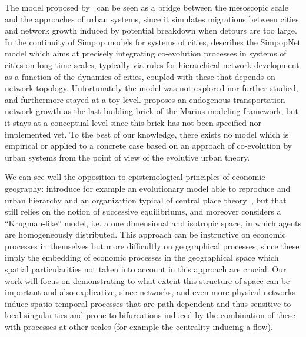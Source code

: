 
The model proposed by~\cite{blumenfeld2010network} can be seen as a bridge between the mesoscopic scale and the approaches of urban systems, since it simulates migrations between cities and network growth induced by potential breakdown when detours are too large. In the continuity of Simpop models for systems of cities, \cite{schmitt2014modelisation} describes the SimpopNet model which aims at precisely integrating co-evolution processes in systems of cities on long time scales, typically via rules for hierarchical network development as a function of the dynamics of cities, coupled with these that depends on network topology. Unfortunately the model was not explored nor further studied, and furthermore stayed at a toy-level. \cite{cottineau2014evolution} proposes an endogenous transportation network growth as the last building brick of the Marius modeling framework, but it stays at a conceptual level since this brick has not been specified nor implemented yet. To the best of our knowledge, there exists no model which is empirical or applied to a concrete case based on an approach of co-evolution by urban systems from the point of view of the evolutive urban theory.



We can see well the opposition to epistemological principles of economic geography: \cite{fujita1999evolution} introduce for example an evolutionary model able to reproduce and urban hierarchy and an organization typical of central place theory~\citep{banos2011christaller}, but that still relies on the notion of successive equilibriums, and moreover considers a ``Krugman-like'' model, i.e. a one dimensional and isotropic space, in which agents are homogeneously distributed. This approach can be instructive on economic processes in themselves but more difficultly on geographical processes, since these imply the embedding of economic processes in the geographical space which spatial particularities not taken into account in this approach are crucial. Our work will focus on demonstrating to what extent this structure of space can be important and also explicative, since networks, and even more physical networks induce spatio-temporal processes that are path-dependent and thus sensitive to local singularities and prone to bifurcations induced by the combination of these with processes at other scales (for example the centrality inducing a flow).

